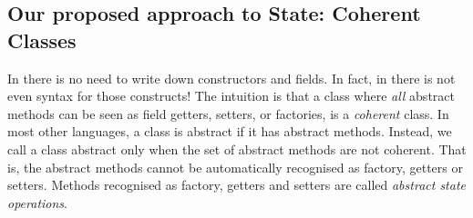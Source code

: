 \subsection{Our proposed approach to State: Coherent Classes}

In \name there is no need to write down constructors and fields. In fact, in
\name there is not even syntax for those constructs!  The intuition is that
a class where \emph{all} abstract methods can be seen as field getters, setters, or factories,
is a \emph{coherent} class.  In most other languages, a class is
abstract if it has abstract methods.  Instead, we call a class
abstract only when the set of abstract methods are not coherent. That
is, the abstract methods cannot be automatically recognised
as factory, getters or setters. Methods recognised as factory, getters and setters are called
\emph{abstract state operations}.
  
